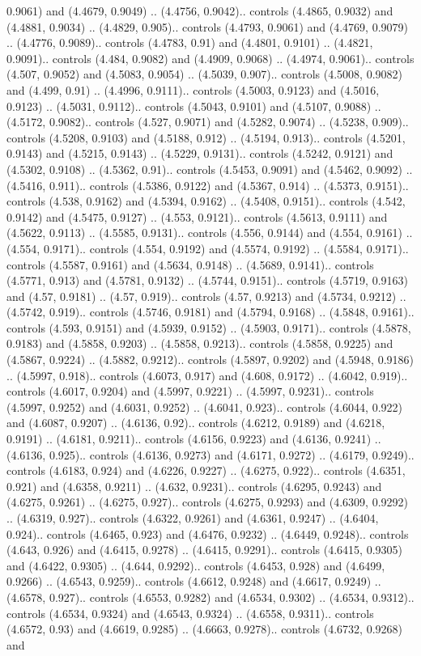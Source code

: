 0.9061) and (4.4679, 0.9049) .. (4.4756, 0.9042).. controls (4.4865, 0.9032) and (4.4881, 0.9034) .. (4.4829, 0.905).. controls (4.4793, 0.9061) and (4.4769, 0.9079) .. (4.4776, 0.9089).. controls (4.4783, 0.91) and (4.4801, 0.9101) .. (4.4821, 0.9091).. controls (4.484, 0.9082) and (4.4909, 0.9068) .. (4.4974, 0.9061).. controls (4.507, 0.9052) and (4.5083, 0.9054) .. (4.5039, 0.907).. controls (4.5008, 0.9082) and (4.499, 0.91) .. (4.4996, 0.9111).. controls (4.5003, 0.9123) and (4.5016, 0.9123) .. (4.5031, 0.9112).. controls (4.5043, 0.9101) and (4.5107, 0.9088) .. (4.5172, 0.9082).. controls (4.527, 0.9071) and (4.5282, 0.9074) .. (4.5238, 0.909).. controls (4.5208, 0.9103) and (4.5188, 0.912) .. (4.5194, 0.913).. controls (4.5201, 0.9143) and (4.5215, 0.9143) .. (4.5229, 0.9131).. controls (4.5242, 0.9121) and (4.5302, 0.9108) .. (4.5362, 0.91).. controls (4.5453, 0.9091) and (4.5462, 0.9092) .. (4.5416, 0.911).. controls (4.5386, 0.9122) and (4.5367, 0.914) .. (4.5373, 0.9151).. controls (4.538, 0.9162) and (4.5394, 0.9162) .. (4.5408, 0.9151).. controls (4.542, 0.9142) and (4.5475, 0.9127) .. (4.553, 0.9121).. controls (4.5613, 0.9111) and (4.5622, 0.9113) .. (4.5585, 0.9131).. controls (4.556, 0.9144) and (4.554, 0.9161) .. (4.554, 0.9171).. controls (4.554, 0.9192) and (4.5574, 0.9192) .. (4.5584, 0.9171).. controls (4.5587, 0.9161) and (4.5634, 0.9148) .. (4.5689, 0.9141).. controls (4.5771, 0.913) and (4.5781, 0.9132) .. (4.5744, 0.9151).. controls (4.5719, 0.9163) and (4.57, 0.9181) .. (4.57, 0.919).. controls (4.57, 0.9213) and (4.5734, 0.9212) .. (4.5742, 0.919).. controls (4.5746, 0.9181) and (4.5794, 0.9168) .. (4.5848, 0.9161).. controls (4.593, 0.9151) and (4.5939, 0.9152) .. (4.5903, 0.9171).. controls (4.5878, 0.9183) and (4.5858, 0.9203) .. (4.5858, 0.9213).. controls (4.5858, 0.9225) and (4.5867, 0.9224) .. (4.5882, 0.9212).. controls (4.5897, 0.9202) and (4.5948, 0.9186) .. (4.5997, 0.918).. controls (4.6073, 0.917) and (4.608, 0.9172) .. (4.6042, 0.919).. controls (4.6017, 0.9204) and (4.5997, 0.9221) .. (4.5997, 0.9231).. controls (4.5997, 0.9252) and (4.6031, 0.9252) .. (4.6041, 0.923).. controls (4.6044, 0.922) and (4.6087, 0.9207) .. (4.6136, 0.92).. controls (4.6212, 0.9189) and (4.6218, 0.9191) .. (4.6181, 0.9211).. controls (4.6156, 0.9223) and (4.6136, 0.9241) .. (4.6136, 0.925).. controls (4.6136, 0.9273) and (4.6171, 0.9272) .. (4.6179, 0.9249).. controls (4.6183, 0.924) and (4.6226, 0.9227) .. (4.6275, 0.922).. controls (4.6351, 0.921) and (4.6358, 0.9211) .. (4.632, 0.9231).. controls (4.6295, 0.9243) and (4.6275, 0.9261) .. (4.6275, 0.927).. controls (4.6275, 0.9293) and (4.6309, 0.9292) .. (4.6319, 0.927).. controls (4.6322, 0.9261) and (4.6361, 0.9247) .. (4.6404, 0.924).. controls (4.6465, 0.923) and (4.6476, 0.9232) .. (4.6449, 0.9248).. controls (4.643, 0.926) and (4.6415, 0.9278) .. (4.6415, 0.9291).. controls (4.6415, 0.9305) and (4.6422, 0.9305) .. (4.644, 0.9292).. controls (4.6453, 0.928) and (4.6499, 0.9266) .. (4.6543, 0.9259).. controls (4.6612, 0.9248) and (4.6617, 0.9249) .. (4.6578, 0.927).. controls (4.6553, 0.9282) and (4.6534, 0.9302) .. (4.6534, 0.9312).. controls (4.6534, 0.9324) and (4.6543, 0.9324) .. (4.6558, 0.9311).. controls (4.6572, 0.93) and (4.6619, 0.9285) .. (4.6663, 0.9278).. controls (4.6732, 0.9268) and 